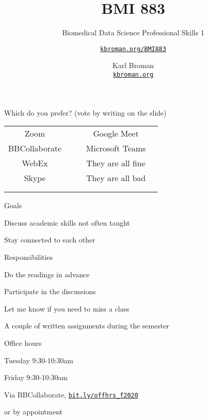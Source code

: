 \documentclass[aspectratio=169,12pt,t]{beamer}
\title{BMI 883}
\subtitle{Biomedical Data Science Professional Skills 1}
\author{\href{https://kbroman.org/BMI883}{\tt kbroman.org/BMI883} }
\institute{}
\date{\small \hspace{3in} Karl Broman \\
  \hspace{3in} \href{https://kbroman.org}{\color{foreground}
    \small \tt kbroman.org}}
\begin{document}
\begin{frame}[c]{Which do you prefer? {\hilit (vote by writing on the slide)}}

\renewcommand{\arraystretch}{2}
  \begin{tabular}{|c|c|c|c|c|} \cline{1-2} \cline{4-5}
    Zoom            &\hspace{1in} && Google Meet        & \hspace{1in}  \\ \cline{1-2} \cline{4-5}
    BBCollaborate   &&& Microsoft Teams                 & \\ \cline{1-2} \cline{4-5}
    WebEx           &&& They are all fine  & \\ \cline{1-2} \cline{4-5}
    Skype           &&& They are all bad   & \\ \cline{1-2} \cline{4-5}
                    &&&                    & \\ \cline{1-2} \cline{4-5}
                    &&&                    & \\ \cline{1-2} \cline{4-5}
   \end{tabular}

\end{frame}


{
\frame{
  \titlepage
} }




\begin{frame}{Goals}

  \bbi
\item Discuss academic skills not often taught
\item Stay connected to each other
  \ei

\end{frame}




\begin{frame}{Responsibilities}

  \bbi
\item Do the readings in advance
\item Participate in the discussions
\item Let me know if you need to miss a class
\item A couple of written assignments during the semester
  \ei

\end{frame}



\begin{frame}{Office hours}

  \bbi
\item Tuesday 9:30-10:30am
\item Friday 9:30-10:30am
\item Via BBCollaborate, \href{https://bit.ly/offhrs_f2020}{\tt bit.ly/offhrs\_f2020}
\item \hilit or by appointment
\ei

\end{frame}
\end{document}
